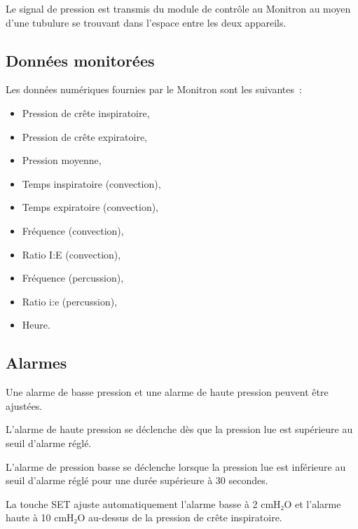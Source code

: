 Le signal de pression est transmis du module de contrôle au Monitron au moyen d’une tubulure se trouvant dans l’espace entre les deux appareils.

\subsection{Données monitorées}

Les données numériques fournies par le Monitron sont les suivantes :

\begin{itemize}
\item Pression de crête inspiratoire,
\item Pression de crête expiratoire,
\item Pression moyenne,
\item Temps inspiratoire (convection),
\item Temps expiratoire (convection),
\item Fréquence (convection),
\item Ratio I:E (convection),
\item Fréquence (percussion),
\item Ratio i:e (percussion),
\item Heure.
\end{itemize}

\subsection{Alarmes}

Une alarme de basse pression et une alarme de haute pression peuvent être ajustées.

L’alarme de haute pression se déclenche dès que la pression lue est supérieure au seuil d’alarme réglé.

L’alarme de pression basse se déclenche lorsque la pression lue est inférieure au seuil d’alarme réglé pour une durée supérieure à 30 secondes.

La touche SET ajuste automatiquement l’alarme basse à 2 cmH₂O et l’alarme haute à 10 cmH₂O au-dessus de la pression de crête inspiratoire.

